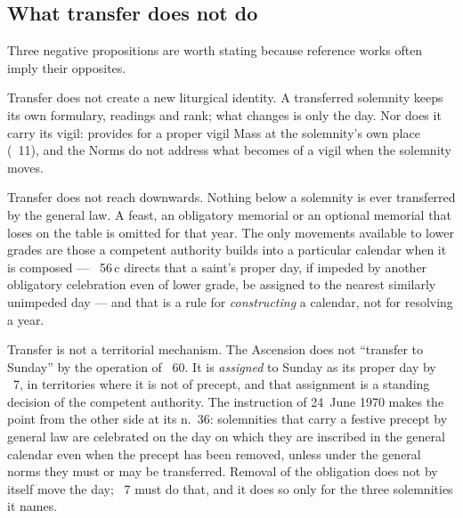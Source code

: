 \subsection{What transfer does not do}

Three negative propositions are worth stating because reference works often imply their opposites.

Transfer does not create a new liturgical identity. A transferred solemnity keeps its own
formulary, readings and rank; what changes is only the day. Nor does it carry its vigil: 
provides for a proper vigil Mass at the solemnity's own place (~11), and the Norms do not
address what becomes of a vigil when the solemnity moves.

Transfer does not reach downwards. Nothing below a solemnity is ever transferred by the general law.
A feast, an obligatory memorial or an optional memorial that loses on the table is omitted for that
year. The only movements available to lower grades are those a competent authority builds into a
particular calendar when it is composed --- ~56\,c directs that a saint's proper day, if
impeded by another obligatory celebration even of lower grade, be assigned to the nearest similarly
unimpeded day --- and that is a rule for \emph{constructing} a calendar, not for resolving a
year.

Transfer is not a territorial mechanism. The Ascension does not ``transfer to Sunday'' by the
operation of ~60. It is \emph{assigned} to Sunday as its proper day by ~7,
in territories where it is not of precept, and that assignment is a standing decision of the
competent authority. The instruction  of 24~June 1970 makes the point
from the other side at its n.~36: solemnities that carry a festive precept by general law are
celebrated on the day on which they are inscribed in the general calendar even when the precept has
been removed, unless under the general norms they must or may be transferred. Removal of the
obligation does not by itself move the day; ~7 must do that, and it does so only for the
three solemnities it names.
